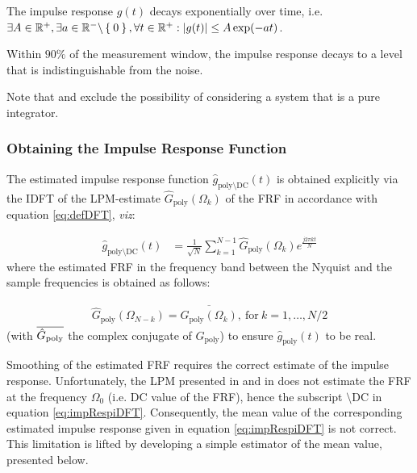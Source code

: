 \begin{assumption}\label{ass:imprespdecay}
The impulse response $g(t)$ decays exponentially over time, i.e. $\exists A \in {\ensuremath{\mathbb{R}}}^{+}, \exists a \in {\ensuremath{\mathbb{R}}}^{-} \backslash \Set{0}, \forall t \in {\ensuremath{\mathbb{R}}}^{+}: \left| g(t) \right| \leq A \exp(- a t)$.
\end{assumption}

\begin{assumption}\label{ass:decay90perctime}
Within $90\%$ of the measurement window, the impulse response decays
 to a level that is indistinguishable from the noise.
\end{assumption}

Note that  and  exclude the possibility of considering a system that is a pure integrator.

\subsubsection{Obtaining the Impulse Response Function}

The estimated impulse response function  $\hat g_{\mathrm{poly}\setminus \mathrm{DC
}}(t)$ is obtained explicitly via the \gls{IDFT} of the \gls{LPM}-estimate $\hat G_\mathrm{poly}(\Omega_k)$ of the \gls{FRF} in accordance with equation \eqref{eq:defDFT}, \emph{viz}:

\begin{align}\label{eq:impRespiDFT}
\hat g_{\mathrm{poly}\setminus \mathrm{DC
}}(t) &= \frac{1}{\sqrt{N}}\sum_{k=1}^{N-1}\hat G_\mathrm{poly}(\Omega_k)e^{\frac{j2\pi kt}{N}}
\end{align}
where the estimated \gls{FRF} in the frequency band between  the Nyquist and the sample frequencies is obtained as follows:

\begin{align}
\hat G_\mathrm{poly}(\Omega_{N-k}) = \overline{\hat G_\mathrm{poly}(\Omega_k)},\ \text{for}\ k=1,\dots,N/2
\end{align}
(with $\overline{\hat G_\mathrm{poly}}$ the complex conjugate of $\hat G_\mathrm{poly}$) to ensure $\hat g_\mathrm{poly}(t)$ to be real.

Smoothing of the estimated \gls{FRF} requires the correct estimate of the impulse response. Unfortunately, the \gls{LPM} presented in  and in \citep{Schoukens2009LPM} does not estimate the \gls{FRF}  at the frequency $\Omega_0$ (i.e. \gls{DC} value of the \gls{FRF}), hence the subscript $\setminus\mathrm{DC}$ in equation \eqref{eq:impRespiDFT}. Consequently, the mean value of the corresponding estimated impulse response given in equation \eqref{eq:impRespiDFT} is not correct. 
This limitation is lifted by developing a simple estimator of the mean value, presented below.

